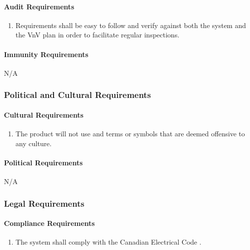 \documentclass[12pt]{article}
\begin{document}
{\paragraph{Audit Requirements}
\begin{enumerate}[{SR}1., leftmargin=2\parindent, resume]
    \item Requirements shall be easy to follow and verify against both the system and the VnV plan in order to facilitate regular inspections.
\end{enumerate}

\paragraph{Immunity Requirements}
N/A



\subsubsection{Political and Cultural Requirements}
\label{NFR_PC}
\paragraph{Cultural Requirements}
\begin{enumerate}[{PC}1., leftmargin=2\parindent]
    \item The product will not use and terms or symbols that are deemed offensive to any culture.
\end{enumerate}

\paragraph{Political Requirements}
N/A



\subsubsection{Legal Requirements}
\label{NFR_Legal}
\paragraph{Compliance Requirements}
\begin{enumerate}[{LR}1., leftmargin=2\parindent]
    \item The system shall comply with the Canadian Electrical Code \cite{CanadianElectricalCode2021}.
\end{enumerate}

}
\end{document}
